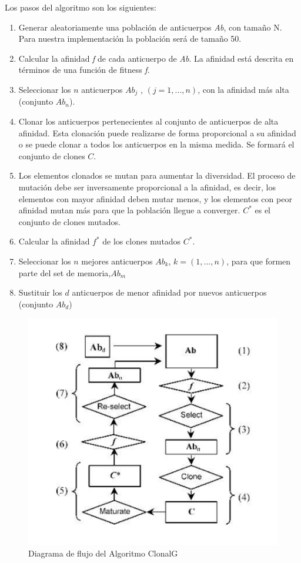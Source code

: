 \documentclass[10pt,a4paper]{article}
\begin{document}
	Los pasos del algoritmo son los siguientes:	
	\begin{enumerate}
		\item  Generar aleatoriamente una población de anticuerpos \textit{Ab}, con tamaño N. Para nuestra implementación la población será de tamaño 50.
		
		\item Calcular la afinidad \textit{f} de cada anticuerpo de \textit{Ab}. La afinidad está descrita en
		términos de una función de fitness \textit{f}.
		
		\item Seleccionar los $ n $ anticuerpos $ Ab_j $ , $ (j= 1,..., n) $, con la afinidad más alta (conjunto $ Ab_n $).		
		
		\item Clonar los anticuerpos pertenecientes al conjunto de anticuerpos de alta afinidad. Esta clonación puede realizarse de forma proporcional a su afinidad o se puede clonar a todos los
		anticuerpos en la misma medida. Se formará el conjunto de clones $C$.
		
		\item Los elementos clonados se mutan para aumentar la diversidad. El proceso de
		mutación debe ser inversamente proporcional a la afinidad, es decir, los
		elementos con mayor afinidad deben mutar menos, y los elementos con peor
		afinidad mutan más para que la población llegue a converger. $C^{*}$ es el conjunto
		de clones mutados.
		
		\item Calcular la afinidad $ f^* $ de los clones mutados $ C^* $.
		
		\item Seleccionar los $ n $ mejores anticuerpos $ Ab_k $, $k=(1,..., n)$, para que formen parte del set de memoria,$Ab_m$
		
		\item Sustituir los $ d $ anticuerpos de menor afinidad por nuevos anticuerpos (conjunto $ Ab_d $)
	\end{enumerate}
	\begin{figure}[H]
		\centering
		\includegraphics[width=0.8\linewidth]{img/diagrama}
		\caption{Diagrama de flujo del Algoritmo ClonalG}
		\label{fig:diagrama}
	\end{figure}
	
\end{document}
